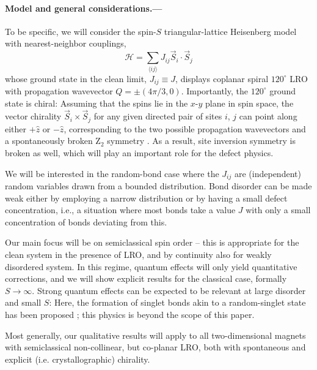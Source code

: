\documentclass[twocolumn,english,aps,showpacs,prl,floatfix]{revtex4-1}
\begin{document}


\paragraph{Model and general considerations.---}
%
To be specific, we will consider the spin-$S$ triangular-lattice Heisenberg model with nearest-neighbor couplings,
\begin{equation}
\mathcal{H} = \sum_{\langle ij\rangle} J_{ij} \vec{S}_i\cdot\vec{S}_j
\end{equation}
whose ground state in the clean limit, $J_{ij} \equiv J$, displays coplanar spiral $120^\circ$ LRO with propagation wavevector $Q=\pm(4\pi/3,0)$.
%
Importantly, the $120^\circ$ ground state is chiral: Assuming that the spins lie in the $x$-$y$ plane in spin space, the vector chirality $\vec{S}_i\times\vec{S}_j$ for any given directed pair of sites $i$, $j$ can point along either $+\hat{z}$ or $-\hat{z}$, corresponding to the two possible propagation wavevectors and a spontaneously broken Z$_2$ symmetry \cite{braggfoot}. As a result, site inversion symmetry is broken as well, which will play an important role for the defect physics.

We will be interested in the random-bond case where the $J_{ij}$ are (independent) random variables drawn from a bounded distribution. Bond disorder can be made weak either by employing a narrow distribution or by having a small defect concentration, i.e., a situation where most bonds take a value $J$ with only a small concentration of bonds deviating from this.

Our main focus will be on semiclassical spin order -- this is appropriate for the clean system in the presence of LRO, and by continuity also for weakly disordered system. In this regime, quantum effects will only yield quantitative corrections, and we will show explicit results for the classical case, formally $S\to\infty$.
%
Strong quantum effects can be expected to be relevant at large disorder and small $S$: Here, the formation of singlet bonds akin to a random-singlet state has been proposed \cite{kawamura14}; this physics is beyond the scope of this paper.

Most generally, our qualitative results will apply to all two-dimensional magnets with semiclassical non-collinear, but co-planar LRO, both with spontaneous and explicit (i.e. crystallographic) chirality.

\end{document}
